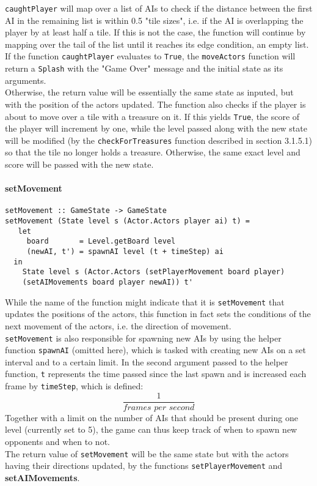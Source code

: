 \documentclass{article}
\begin{document}
		\noindent\texttt{caughtPlayer} will map over a list of AIs to check if the distance between the first AI in the remaining list is within 0.5 "tile sizes", i.e. if the AI is overlapping the player by at least half a tile. If this is not the case, the function will continue by mapping over the tail of the list until it reaches its edge condition, an empty list. \\
        \newline
        If the function \texttt{caughtPlayer} evaluates to \texttt{True}, the \texttt{moveActors} function will return a \texttt{Splash} with the "Game Over" message and the initial state as its arguments. \\
        \newline
        Otherwise, the return value will be essentially the same state as inputed, but with the position of the actors updated. The function also checks if the player is about to move over a tile with a treasure on it. If this yields \texttt{True}, the score of the player will increment by one, while the level passed along with the new state will be modified (by the \texttt{checkForTreasures} function described in section 3.1.5.1) so that the tile no longer holds a treasure. Otherwise, the same exact level and score will be passed with the new state.
		\paragraph{setMovement}
\begin{verbatim}
setMovement :: GameState -> GameState
setMovement (State level s (Actor.Actors player ai) t) =
   let
     board       = Level.getBoard level
     (newAI, t') = spawnAI level (t + timeStep) ai
  in
    State level s (Actor.Actors (setPlayerMovement board player)
    (setAIMovements board player newAI)) t'
\end{verbatim}
		While the name of the function might indicate that it is \texttt{setMovement} that updates the positions of the actors, this function in fact sets the conditions of the next movement of the actors, i.e. the direction of movement. \\
		\newline
		\texttt{setMovement} is also responsible for spawning new AIs by using the helper function \texttt{spawnAI} (omitted here), which is tasked with creating new AIs on a set interval and to a certain limit. In the second argument passed to the helper function, \texttt{t} represents the time passed since the last spawn and is increased each frame by \texttt{timeStep}, which is defined: \[\frac{1}{\textit{frames per second}}\]
		Together with a limit on the number of AIs that should be present during one level (currently set to 5), the game can thus keep track of when to spawn new opponents and when to not. \\
        \newline
        The return value of \texttt{setMovement} will be the same state but with the actors having their directions updated, by the functions \texttt{setPlayerMovement} and \textbf{setAIMovements}.
\end{document}
